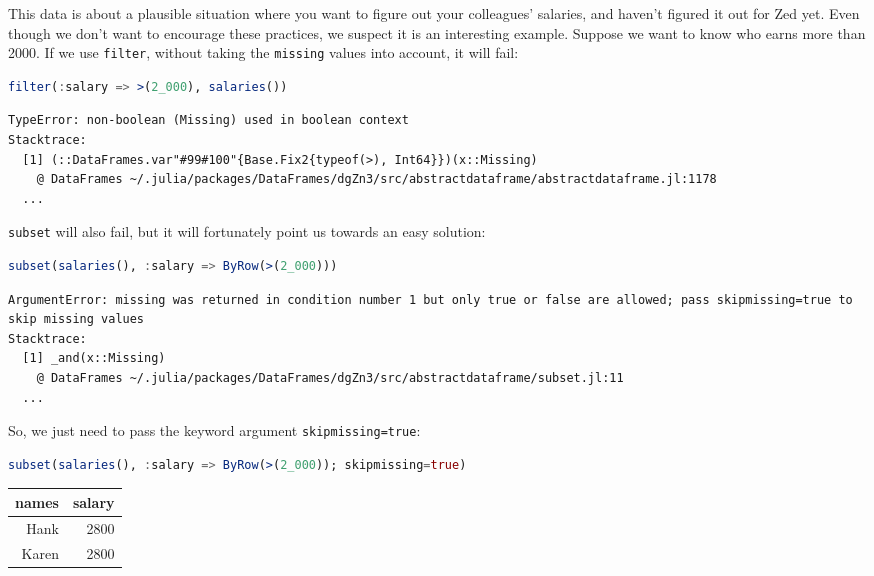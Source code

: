 \documentclass[
  notoc %
]{tufte-book}
\newcommand{\passthrough}[1]{#1}
\begin{document}
This data is about a plausible situation where you want to figure out
your colleagues' salaries, and haven't figured it out for Zed yet. Even
though we don't want to encourage these practices, we suspect it is an
interesting example. Suppose we want to know who earns more than 2000.
If we use \passthrough{\lstinline!filter!}, without taking the
\passthrough{\lstinline!missing!} values into account, it will fail:

\begin{lstlisting}[language=Julia]
filter(:salary => >(2_000), salaries())
\end{lstlisting}

\begin{lstlisting}[language=Output]
TypeError: non-boolean (Missing) used in boolean context
Stacktrace:
  [1] (::DataFrames.var"#99#100"{Base.Fix2{typeof(>), Int64}})(x::Missing)
    @ DataFrames ~/.julia/packages/DataFrames/dgZn3/src/abstractdataframe/abstractdataframe.jl:1178
  ...
\end{lstlisting}

\passthrough{\lstinline!subset!} will also fail, but it will fortunately
point us towards an easy solution:

\begin{lstlisting}[language=Julia]
subset(salaries(), :salary => ByRow(>(2_000)))
\end{lstlisting}

\begin{lstlisting}[language=Output]
ArgumentError: missing was returned in condition number 1 but only true or false are allowed; pass skipmissing=true to skip missing values
Stacktrace:
  [1] _and(x::Missing)
    @ DataFrames ~/.julia/packages/DataFrames/dgZn3/src/abstractdataframe/subset.jl:11
  ...
\end{lstlisting}

So, we just need to pass the keyword argument
\passthrough{\lstinline!skipmissing=true!}:

\begin{lstlisting}[language=Julia]
subset(salaries(), :salary => ByRow(>(2_000)); skipmissing=true)
\end{lstlisting}

\begin{longtable}[]{@{}rr@{}}
\toprule
names & salary \\
\midrule
\endhead
Hank & 2800 \\
Karen & 2800 \\
\bottomrule
\end{longtable}
\end{document}
